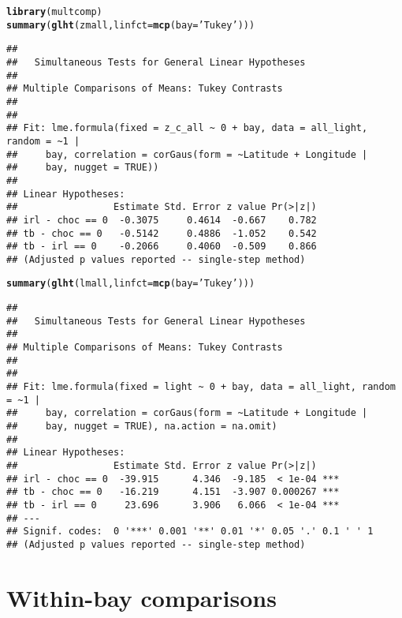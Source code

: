 \documentclass[letterpaper,12pt]{article}\usepackage[]{graphicx}\usepackage[]{color}
\makeatletter
\newcommand{\hlstr}[1]{\textcolor[rgb]{0.192,0.494,0.8}{#1}}%
\newcommand{\hlstd}[1]{\textcolor[rgb]{0.345,0.345,0.345}{#1}}%
\newcommand{\hlkwc}[1]{\textcolor[rgb]{0.333,0.667,0.333}{#1}}%
\newcommand{\hlkwd}[1]{\textcolor[rgb]{0.737,0.353,0.396}{\textbf{#1}}}%
\newenvironment{kframe}{%
 \def\at@end@of@kframe{}%
 \ifinner\ifhmode%
  \def\at@end@of@kframe{\end{minipage}}%
  \begin{minipage}{\columnwidth}%
 \fi\fi%
 \def\FrameCommand##1{\hskip\@totalleftmargin \hskip-\fboxsep
 \colorbox{shadecolor}{##1}\hskip-\fboxsep
     \hskip-\linewidth \hskip-\@totalleftmargin \hskip\columnwidth}%
 \MakeFramed {\advance\hsize-\width
   \@totalleftmargin\z@ \linewidth\hsize
   \@setminipage}}%
 {\par\unskip\endMakeFramed%
 \at@end@of@kframe}
\newenvironment{knitrout}{}{} %
\makeatother
\begin{document}
\begin{knitrout}
\color{fgcolor}\begin{kframe}
\begin{alltt}
\hlkwd{library}\hlstd{(multcomp)}
\hlkwd{summary}\hlstd{(}\hlkwd{glht}\hlstd{(zmall,} \hlkwc{linfct} \hlstd{=} \hlkwd{mcp}\hlstd{(}\hlkwc{bay} \hlstd{=} \hlstr{'Tukey'}\hlstd{)))}
\end{alltt}
\begin{verbatim}
## 
## 	 Simultaneous Tests for General Linear Hypotheses
## 
## Multiple Comparisons of Means: Tukey Contrasts
## 
## 
## Fit: lme.formula(fixed = z_c_all ~ 0 + bay, data = all_light, random = ~1 | 
##     bay, correlation = corGaus(form = ~Latitude + Longitude | 
##     bay, nugget = TRUE))
## 
## Linear Hypotheses:
##                 Estimate Std. Error z value Pr(>|z|)
## irl - choc == 0  -0.3075     0.4614  -0.667    0.782
## tb - choc == 0   -0.5142     0.4886  -1.052    0.542
## tb - irl == 0    -0.2066     0.4060  -0.509    0.866
## (Adjusted p values reported -- single-step method)
\end{verbatim}
\begin{alltt}
\hlkwd{summary}\hlstd{(}\hlkwd{glht}\hlstd{(lmall,} \hlkwc{linfct} \hlstd{=} \hlkwd{mcp}\hlstd{(}\hlkwc{bay} \hlstd{=} \hlstr{'Tukey'}\hlstd{)))}
\end{alltt}
\begin{verbatim}
## 
## 	 Simultaneous Tests for General Linear Hypotheses
## 
## Multiple Comparisons of Means: Tukey Contrasts
## 
## 
## Fit: lme.formula(fixed = light ~ 0 + bay, data = all_light, random = ~1 | 
##     bay, correlation = corGaus(form = ~Latitude + Longitude | 
##     bay, nugget = TRUE), na.action = na.omit)
## 
## Linear Hypotheses:
##                 Estimate Std. Error z value Pr(>|z|)    
## irl - choc == 0  -39.915      4.346  -9.185  < 1e-04 ***
## tb - choc == 0   -16.219      4.151  -3.907 0.000267 ***
## tb - irl == 0     23.696      3.906   6.066  < 1e-04 ***
## ---
## Signif. codes:  0 '***' 0.001 '**' 0.01 '*' 0.05 '.' 0.1 ' ' 1
## (Adjusted p values reported -- single-step method)
\end{verbatim}
\end{kframe}
\end{knitrout}

\section{Within-bay comparisons}
\end{document}
